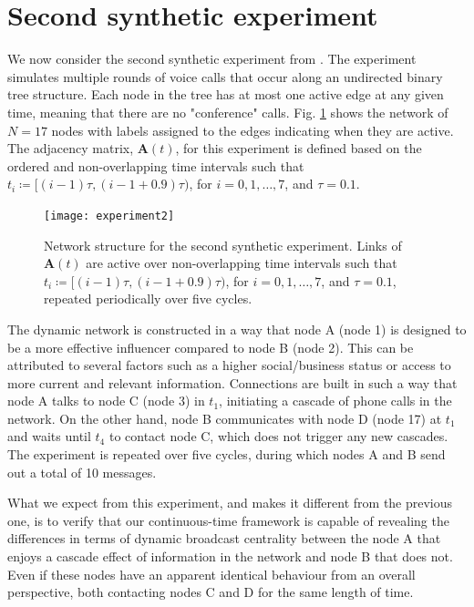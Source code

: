 \newpage
\section{Second synthetic experiment}
\label{sec:synexp2}
We now consider the second synthetic experiment from \cite{grindrod2014dynamical}. The experiment simulates multiple rounds of voice calls that occur along an undirected binary tree structure. Each node in the tree has at most one active edge at any given time, meaning that there are no "conference" calls. Fig. \ref{fig:exp2} shows the network of $N=17$ nodes with labels assigned to the edges indicating when they are active. The adjacency matrix, $\mathbf{A}(t)$, for this experiment is defined based on the ordered and non-overlapping time intervals such that $t_i\coloneqq[(i − 1)\tau , (i − 1 + 0.9)\tau )$, for $i=0, 1, \dots , 7$, and $\tau =0.1$.

\begin{figure}[h]\centering
    \texttt{[image: experiment2]}
    \caption{Network structure for the second synthetic experiment. Links of $\mathbf{A}(t)$ are active over non-overlapping time intervals such that $t_i\coloneqq[(i − 1)\tau , (i − 1 + 0.9)\tau )$, for $i=0, 1, \dots , 7$, and $\tau =0.1$, repeated periodically over five cycles.}
    \label{fig:exp2}
    \bigskip
\end{figure}

The dynamic network is constructed in a way that node A (node 1) is designed to be a more effective influencer compared to node B (node 2). This can be attributed to several factors such as a higher social/business status or access to more current and relevant information. Connections are built in such a way that node A talks to node C (node 3) in $t_1$, initiating a cascade of phone calls in the network. On the other hand, node B communicates with node D (node 17) at $t_1$ and waits until $t_4$ to contact node C, which does not trigger any new cascades. The experiment is repeated over five cycles, during which nodes A and B send out a total of 10 messages. 

What we expect from this experiment, and makes it different from the previous one, is to verify that our continuous-time framework is capable of revealing the differences in terms of dynamic broadcast centrality between the node A that enjoys a cascade effect of information in the network and node B that does not. Even if these nodes have an apparent identical behaviour from an overall perspective, both contacting nodes C and D for the same length of time.

